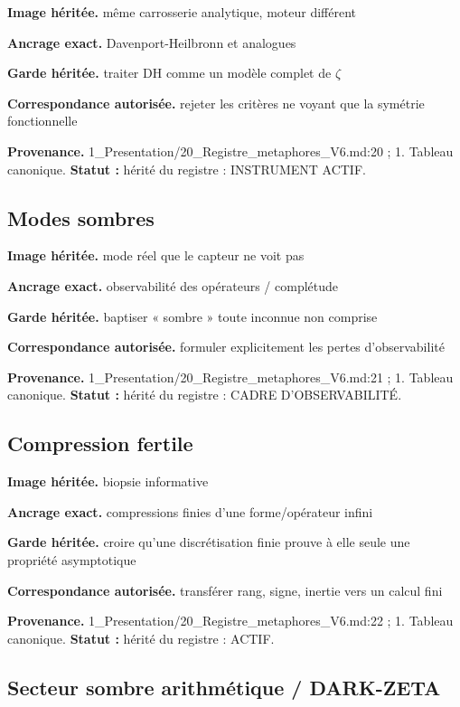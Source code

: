\documentclass[
  9pt,
  a4paper,
]{article}
\begin{document}
\textbf{Image héritée.} même carrosserie analytique, moteur différent

\textbf{Ancrage exact.} Davenport-Heilbronn et analogues

\textbf{Garde héritée.} traiter DH comme un modèle complet de \(\zeta\)

\textbf{Correspondance autorisée.} rejeter les critères ne voyant que la
symétrie fonctionnelle

\textbf{Provenance.} 1\_Presentation/20\_Registre\_metaphores\_V6.md:20
; 1. Tableau canonique. \textbf{Statut :} hérité du registre :
INSTRUMENT ACTIF.

\hypertarget{modes-sombres}{%
\subsection{Modes sombres}\label{modes-sombres}}

\textbf{Image héritée.} mode réel que le capteur ne voit pas

\textbf{Ancrage exact.} observabilité des opérateurs / complétude

\textbf{Garde héritée.} baptiser « sombre » toute inconnue non comprise

\textbf{Correspondance autorisée.} formuler explicitement les pertes
d'observabilité

\textbf{Provenance.} 1\_Presentation/20\_Registre\_metaphores\_V6.md:21
; 1. Tableau canonique. \textbf{Statut :} hérité du registre : CADRE
D'OBSERVABILITÉ.

\hypertarget{compression-fertile}{%
\subsection{Compression fertile}\label{compression-fertile}}

\textbf{Image héritée.} biopsie informative

\textbf{Ancrage exact.} compressions finies d'une forme/opérateur infini

\textbf{Garde héritée.} croire qu'une discrétisation finie prouve à elle
seule une propriété asymptotique

\textbf{Correspondance autorisée.} transférer rang, signe, inertie vers
un calcul fini

\textbf{Provenance.} 1\_Presentation/20\_Registre\_metaphores\_V6.md:22
; 1. Tableau canonique. \textbf{Statut :} hérité du registre : ACTIF.

\hypertarget{secteur-sombre-arithmuxe9tique-dark-zeta}{%
\subsection{Secteur sombre arithmétique /
DARK-ZETA}\label{secteur-sombre-arithmuxe9tique-dark-zeta}}
\end{document}
